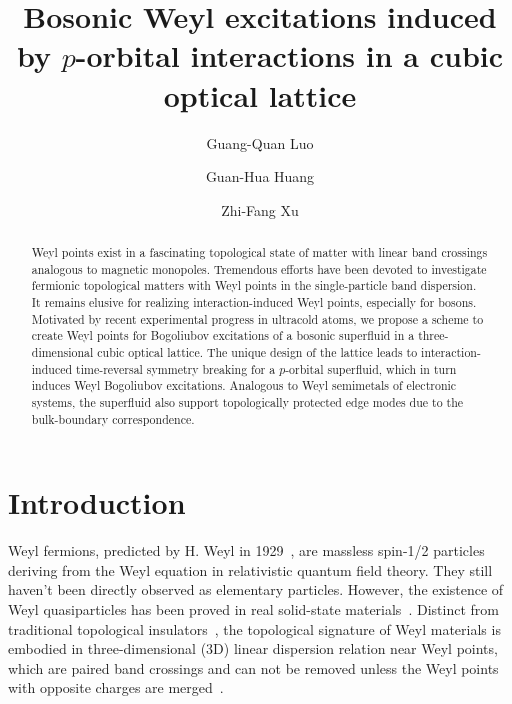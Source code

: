 \documentclass[aps,pra,floatfix,twocolumn,superscriptaddress]{revtex4-1}
\begin{document}
\title{Bosonic Weyl excitations induced by $p$-orbital interactions in a cubic optical lattice}

\author{Guang-Quan Luo}

\author{Guan-Hua Huang}

\author{Zhi-Fang Xu}

\begin{abstract}
Weyl points exist in a fascinating topological state of matter with linear band crossings analogous to magnetic monopoles. Tremendous efforts have been devoted to investigate fermionic topological matters with Weyl points in the single-particle band dispersion. It remains elusive for realizing interaction-induced Weyl points, especially for bosons. Motivated by recent experimental progress in ultracold atoms, we propose a scheme to create Weyl points for Bogoliubov excitations of a bosonic superfluid in a three-dimensional cubic optical lattice. The unique design of the lattice leads to interaction-induced time-reversal symmetry breaking for a $p$-orbital superfluid, which in turn induces Weyl Bogoliubov excitations. Analogous to Weyl semimetals of electronic systems, the superfluid also support topologically protected edge modes due to the bulk-boundary correspondence.
\end{abstract}

\maketitle
\section{Introduction}
\label{Introduction}
Weyl fermions, predicted by H. Weyl in 1929~\cite{weyl1929gravitation}, are massless spin-1/2 particles deriving from the Weyl equation in relativistic quantum field theory. They still haven't been directly observed as elementary particles. However, the existence of Weyl quasiparticles has been proved in real solid-state materials~\cite{PhysRevB.83.205101,PhysRevLett.107.127205,PhysRevX.5.011029,Huang2015,xu2015discovery,PhysRevX.5.031013,PhysRevX.5.031023}. Distinct from traditional topological insulators~\cite{PhysRevLett.61.2015,RevModPhys.82.3045,RevModPhys.83.1057,RevModPhys.88.021004}, the topological signature of Weyl materials is embodied in three-dimensional (3D) linear dispersion relation near Weyl points, which are paired band crossings and can not be removed unless the Weyl points with opposite charges are merged~\cite{turner2013beyond,wehling2014dirac,RevModPhys.90.015001}.
\end{document}
